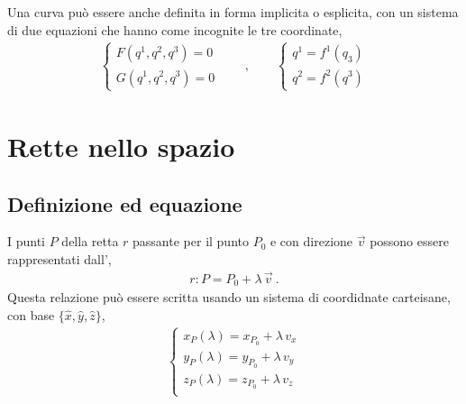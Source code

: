 \documentclass[letterpaper,10pt,english]{jupyterBook}
\begin{document}
\sphinxAtStartPar
Una curva può essere anche definita in forma implicita o esplicita, con un sistema di due equazioni che hanno come incognite le tre coordinate,
\begin{equation*}
\begin{split}
\begin{cases} F(q^1, q^2, q^3) = 0 \\ G(q^1, q^2, q^3) = 0 \end{cases} \qquad, \qquad
\begin{cases} q^1 = f^1(q_3) \\ q^2 = f^2(q^3) \end{cases}
\end{split}
\end{equation*}
\sphinxstepscope


\section{Rette nello spazio}
\label{\detokenize{ch/analytic_geometry/analytic_geometry_3d/lines:rette-nello-spazio}}\label{\detokenize{ch/analytic_geometry/analytic_geometry_3d/lines:geometry-analytic-3d-lines}}\label{\detokenize{ch/analytic_geometry/analytic_geometry_3d/lines::doc}}

\subsection{Definizione ed equazione}
\label{\detokenize{ch/analytic_geometry/analytic_geometry_3d/lines:definizione-ed-equazione}}
\sphinxAtStartPar
{} I punti \(P\) della retta \(r\) passante per il punto \(P_0\) e con direzione \(\vec{v}\) possono essere rappresentati dall’,
\begin{equation*}
\begin{split}r: P = P_0 + \lambda \, \vec{v} \ .\end{split}
\end{equation*}
\sphinxAtStartPar
Questa relazione può essere scritta usando un sistema di coordidnate carteisane, con base \(\{ \hat{x}, \hat{y}, \hat{z} \}\),
\begin{equation*}
\begin{split}\begin{cases}
x_P(\lambda) = x_{P_0} + \lambda \, v_x \\
y_P(\lambda) = y_{P_0} + \lambda \, v_y \\
z_P(\lambda) = z_{P_0} + \lambda \, v_z \\
\end{cases}\end{split}
\end{equation*}
\sphinxAtStartPar
{} 
\end{document}
